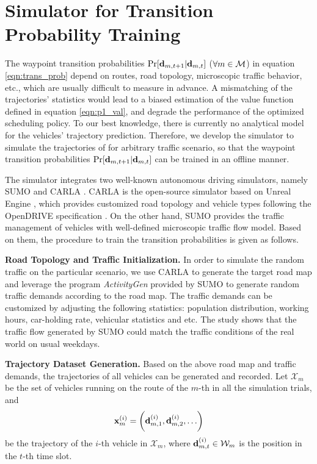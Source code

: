 \section{{\fwName} Simulator for Transition Probability Training}
\label{sec:framework}

The waypoint transition probabilities $\Pr[\mathbf{d}_{m,t+1}|\mathbf{d}_{m,t}]$ ($\forall m\in\mathcal{M}$) in equation \eqref{eqn:trans_prob} depend on routes, road topology, microscopic traffic behavior, etc., which are usually difficult to measure in advance.
A mismatching of the trajectories' statistics would lead to a biased estimation of the value function defined in equation \eqref{eqn:p1_val}, and degrade the performance of the optimized scheduling policy. To our best knowledge, there is currently no analytical model for the vehicles' trajectory prediction.
Therefore, we develop the {\fwName} simulator to simulate the trajectories of {\IAVs} for arbitrary traffic scenario, so that the waypoint transition probabilities $\Pr[\mathbf{d}_{m,t+1}|\mathbf{d}_{m,t}]$ can be trained in an offline manner.

The {\fwName} simulator integrates two well-known autonomous driving simulators, namely SUMO \cite{SUMO} and CARLA \cite{CARLA}.
CARLA is the open-source simulator based on Unreal Engine \cite{unrealengine}, which provides customized road topology and vehicle types following the OpenDRIVE specification \cite{OpenDRIVE}.
On the other hand, SUMO provides the traffic management of vehicles with well-defined microscopic traffic flow model.
Based on them, the procedure to train the transition probabilities is given as follows.

\textbf{Road Topology and Traffic Initialization.} In order to simulate the random traffic on the particular scenario, we use CARLA to generate the target road map and leverage the program \emph{ActivityGen} provided by SUMO to generate random traffic demands according to the road map. The traffic demands can be customized by adjusting the following statistics: population distribution, working hours, car-holding rate, vehicular statistics and etc.
The study \cite{sumo-accuracy-mdpi} shows that the traffic flow generated by SUMO could match the traffic conditions of the real world on usual weekdays.

\textbf{Trajectory Dataset Generation.} Based on the above road map and traffic demands, the trajectories of all vehicles can be generated and recorded.
Let $\mathcal{X}_{m} $ be the set of vehicles running on the route of the $m$-th {\IAV} in all the simulation trials, and $$ \vec{x}^{(i)}_{m} = \Paren{ \vec{d}^{(i)}_{m,1}, \vec{d}^{(i)}_{m,2}, \dots }$$ be the trajectory of the $ i $-th vehicle in $\mathcal{X}_{m}$, where $\mathbf{d}^{(i)}_{m,t} \in \mathcal{W}_{m}$ is the position in the $ t $-th time slot.

